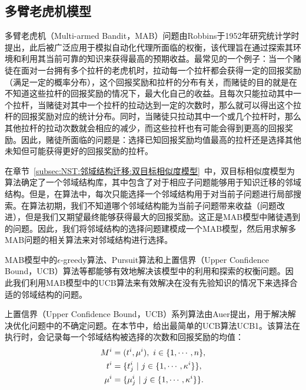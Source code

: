 \subsection{多臂老虎机模型}
\label{subsec:NST:邻域结构迁移:多臂老虎机模型}
多臂老虎机（Multi-armed Bandit，MAB）问题由Robbins于1952年研究统计学时提出\cite{robbins1952some}，此后被广泛应用于模拟自动化代理所面临的权衡，该代理旨在通过探索其环境和利用其当前可靠的知识来获得最高的预期收益\cite{kuleshov2014algorithms}。最常见的一个例子：当一个赌徒在面对一台拥有多个拉杆的老虎机时，拉动每一个拉杆都会获得一定的回报奖励（满足一定的概率分布），这个回报奖励和拉杆的分布有关，而赌徒的目的就是在不知道这些拉杆的回报奖励的情况下，最大化自己的收益。且每次只能拉动其中一个拉杆，当赌徒对其中一个拉杆的拉动达到一定的次数时，那么就可以得出这个拉杆的回报奖励对应的统计分布。同时，当赌徒只拉动其中一个或几个拉杆时，那么其他拉杆的拉动次数就会相应的减少，而这些拉杆也有可能会得到更高的回报奖励。因此，赌徒所面临的问题是：选择已知回报奖励均值最高的拉杆还是选择其他未知但可能获得更好的回报奖励的拉杆\cite{gittins1979bandit}。
\par
在章节~\ref{subsec:NST:邻域结构迁移:双目标相似度模型}~中，双目标相似度模型为算法确定了一个邻域结构库，其中包含了对于相应子问题能够用于知识迁移的邻域结构。但是，在算法中，每次只能选择一个邻域结构用于对当前子问题进行局部搜索。在算法初期，我们不知道哪个邻域结构能为当前子问题带来收益（问题改进），但是我们又期望最终能够获得最大的回报奖励。这正是MAB模型中赌徒遇到的问题。因此，我们将邻域结构的选择问题建模成一个MAB模型，然后用求解多MAB问题的相关算法来对邻域结构进行选择。
\par
MAB模型中的$\epsilon$-greedy算法\cite{cesa1998finite,vermorel2005multi}、Pursuit算法\cite{thathachar1984class,sutton2018reinforcement}和上置信界（Upper Confidence Bound，UCB）算法\cite{auer2002using,garivier2008upper,slivkins2011contextual}等都能够有效地解决该模型中的利用和探索的权衡问题。因此我们利用MAB模型中的UCB算法来有效解决在没有先验知识的情况下来选择合适的邻域结构的问题。
\par
上置信界（Upper Confidence Bound，UCB）系列算法由Auer提出\cite{auer2002using}，用于解决解决优化问题中的不确定问题。在本节中，给出最简单的UCB算法UCB1。该算法在执行时，会记录每一个邻域结构被选择的次数和回报奖励的均值：
\vspace{-1em}
\begin{align}
    \label{eq:MAB Model}
    M^i &= (t^i, \mu^i), \ i \in \{ 1, \cdots, n \}, \\
    t^i &= \{t^i_j \ | \ j \in \{1,\cdots,\kappa^i\} \}, \notag \\
    \mu^i &= \{\mu^i_j \ | \ j \in \{1,\cdots,\kappa^i\} \}. \notag
\end{align}
